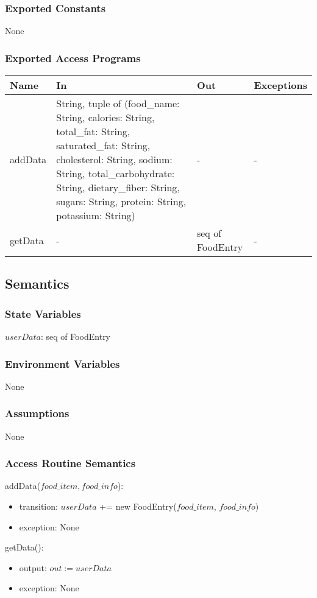 \documentclass[12pt, titlepage]{article}
\begin{document}
\subsubsection{Exported Constants}
None
\subsubsection{Exported Access Programs}
\begin{center}
	\begin{tabular}{p{2cm} p{5cm} p{3cm} p{2cm}}
		\hline
		\textbf{Name} & \textbf{In} & \textbf{Out} & \textbf{Exceptions} \\
		\hline
		addData & String, tuple of (food\_name: String, calories: String, total\_fat: String, saturated\_fat: String, cholesterol: String, sodium: String, total\_carbohydrate: String, dietary\_fiber: String, sugars: String, protein: String, potassium: String) & - & - \\
		getData & - & seq of FoodEntry & - \\
		\hline
	\end{tabular}
\end{center}
\subsection{Semantics}
\subsubsection{State Variables}
$userData$: seq of FoodEntry
\subsubsection{Environment Variables}
None
\subsubsection{Assumptions}
None
\subsubsection{Access Routine Semantics}
\noindent addData($food\_item, food\_info$):
\begin{itemize}
	\item transition: $userData$ += new FoodEntry($food\_item$, $food\_info$)
	\item exception: None
\end{itemize}
\noindent getData():
\begin{itemize}
	\item output: $out := userData$ 
	\item exception: None
\end{itemize}
\end{document}
